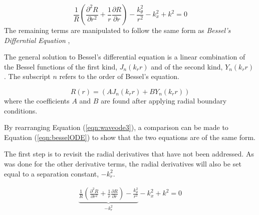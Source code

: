 
\begin{equation}
    \frac{1}{R}
    \left(      
    \frac{\partial^2 R}{\partial r^2 } +
    \frac{1}{r}\frac{\partial R}{\partial r}  
\right) -
    \frac{k_{\theta}^2}{r^2}-  
    k_x^2 + k^2 = 0
    \label{eqn:waveode3}
\end{equation}
The remaining terms are manipulated to follow the same form as \textit{Bessel's Differntial 
Equation} ,


The general solution to Bessel's differential equation is a linear combination of
the Bessel functions of the first kind, $J_n(k_r r)$ and of the second kind, $Y_n(k_r r)$ 
\cite{wolphram:bessel}. The subscript $n$ refers to the order of Bessel's equation.

\begin{equation}
    R(r) = (AJ_n(k_r r) + BY_n(k_r r)) 
    \label{eqn:besselsolution}
\end{equation}
where the coefficients $A$ and $B$ are found after applying radial
boundary conditions. %

By rearranging Equation (\ref{eqn:waveode3}), a comparison can be made to Equation
(\ref{eqn:besselODE}) to show that the two equations are of the same form. 

The first step is to revisit the radial derivatives that have not been addressed.
As was done for the other derivative terms, the radial derivatives will also 
be set equal to a separation constant, $-k_r^2$. 

\begin{align}
    \underbrace{\frac{1}{R}
    \left(      
    \frac{\partial^2 R}{\partial r^2 } +
    \frac{1}{r}\frac{\partial R}{\partial r}  
\right) -
    \frac{k_{\theta}^2}{r^2}}_{-k_r^2}-  
    k_x^2 + k^2 = 0
    \label{eqn:wavenumber_without_kr}
\end{align}

